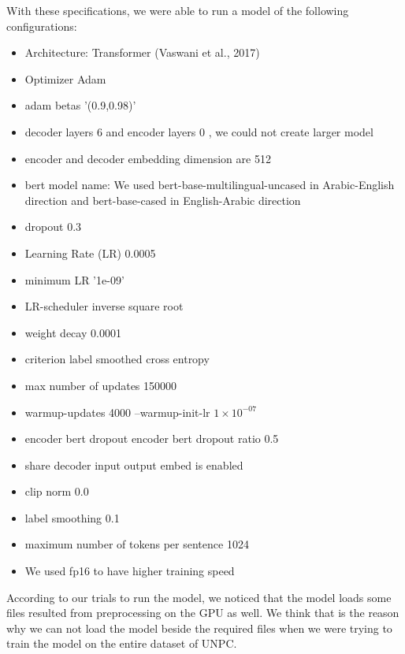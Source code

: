 \documentclass{report}
\begin{document}
With these specifications, we were able to run a model of the following configurations:
\begin{itemize}
	\item Architecture: Transformer (Vaswani et al., 2017)
	\item Optimizer Adam
\item adam betas '(0.9,0.98)' 
\item decoder layers 6 and encoder layers 0 , we could not create larger model
\item encoder and decoder embedding dimension are 512 
\item bert model name: We used bert-base-multilingual-uncased in Arabic-English direction and bert-base-cased in English-Arabic direction 
\item dropout 0.3 
\item Learning Rate (LR) 0.0005
\item minimum LR '1e-09' 
\item LR-scheduler inverse square root
\item weight decay 0.0001 
\item criterion label smoothed cross entropy 
\item max number of updates 150000 
\item warmup-updates 4000 --warmup-init-lr $1 \times 10^{-07}$ 
\item encoder bert dropout encoder bert dropout ratio 0.5
\item share decoder input output embed is enabled
\item clip norm 0.0 
\item label smoothing 0.1 
\item maximum number of tokens per sentence 1024 
\item We used fp16 to have higher training speed
\end{itemize}

According to our trials to run the model, we noticed that the model loads some files resulted from preprocessing on the GPU as well. We think that is the reason why we can not load the model beside the required files when we were trying to train the model on the entire dataset of UNPC.


\cite{citations.bib}
\end{document}
